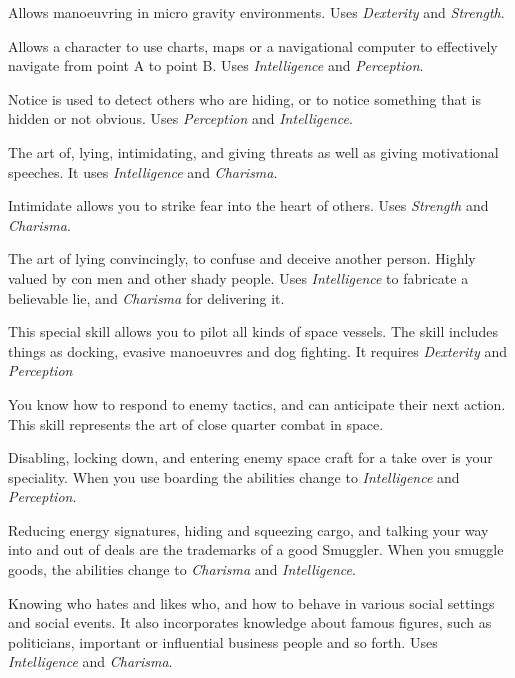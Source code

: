 \begin{description}
   Allows manoeuvring in micro gravity environments. Uses
  \emph{Dexterity} and \emph{Strength}.

   Allows a character to use charts, maps or a navigational
  computer to effectively navigate from point A to point B. Uses
  \emph{Intelligence} and \emph{Perception}.

   Notice is used to detect others who are hiding, or to notice
  something that is hidden or not obvious. Uses \emph{Perception} and
  \emph{Intelligence}.

   The art of, lying, intimidating, and giving threats as well
  as giving motivational speeches. It uses \emph{Intelligence} and \emph{Charisma}.

   Intimidate allows you to strike
  fear into the heart of others. Uses \emph{Strength} and \emph{Charisma}.

   The art of lying convincingly,
  to confuse and deceive another person. Highly valued by con men and other
  shady people. Uses \emph{Intelligence} to fabricate a believable lie, and
  \emph{Charisma} for delivering it.

   This special skill allows you to pilot all
  kinds of space vessels. The skill includes things as docking, evasive
  manoeuvres and dog fighting. It requires \emph{Dexterity} and
  \emph{Perception}

   You know how to respond to
  enemy tactics, and can anticipate their next action. This skill represents the
  art of close quarter combat in space.

   Disabling, locking down, and
  entering enemy space craft for a take over is your speciality. When you use
  boarding the abilities change to \emph{Intelligence} and \emph{Perception}.

   Reducing energy signatures,
  hiding and squeezing cargo, and talking your way into and out of deals are the
  trademarks of a good Smuggler. When you smuggle goods, the abilities change to
  \emph{Charisma} and \emph{Intelligence}.

   Knowing who hates and likes who, and how to behave in
  various social settings and social events. It also incorporates knowledge about
  famous figures, such as politicians, important or influential business people
  and so forth. Uses \emph{Intelligence} and \emph{Charisma}.


\end{description}
